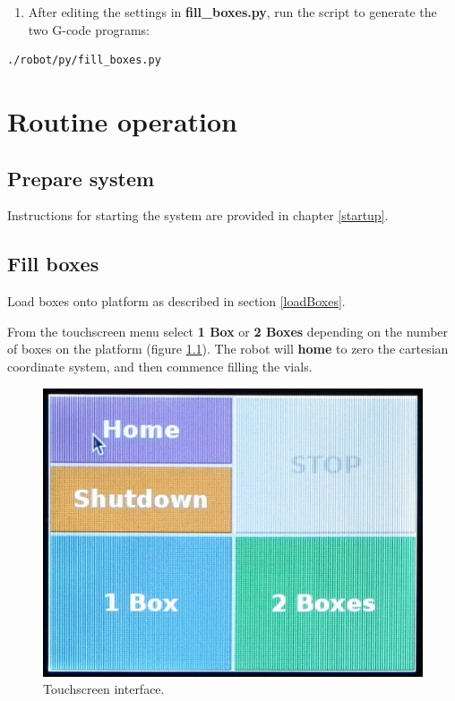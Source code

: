 \documentclass[
]{book}
\providecommand{\tightlist}{%
  \setlength{\itemsep}{0pt}\setlength{\parskip}{0pt}}
\begin{document}
\begin{enumerate}
\def\labelenumi{\arabic{enumi}.}
\setcounter{enumi}{2}
\tightlist
\item
  After editing the settings in \textbf{fill\_boxes.py}, run the script to generate the two G-code programs:
\end{enumerate}

\begin{verbatim}
./robot/py/fill_boxes.py
\end{verbatim}

\hypertarget{operation}{%
\chapter{Routine operation}\label{operation}}

\hypertarget{prepare-system}{%
\section{Prepare system}\label{prepare-system}}

Instructions for starting the system are provided in chapter \ref{startup}.

\hypertarget{fill-boxes}{%
\section{Fill boxes}\label{fill-boxes}}

Load boxes onto platform as described in section \ref{loadBoxes}.

From the touchscreen menu select \textbf{1 Box} or \textbf{2 Boxes} depending on the number of boxes on the platform (figure \ref{fig:touchscreen}). The robot will \textbf{home} to zero the cartesian coordinate system, and then commence filling the vials.

\begin{figure}

{\centering \includegraphics[width=0.6\linewidth]{images/gui} 

}

\caption{Touchscreen interface.}\label{fig:touchscreen}
\end{figure}
\end{document}
